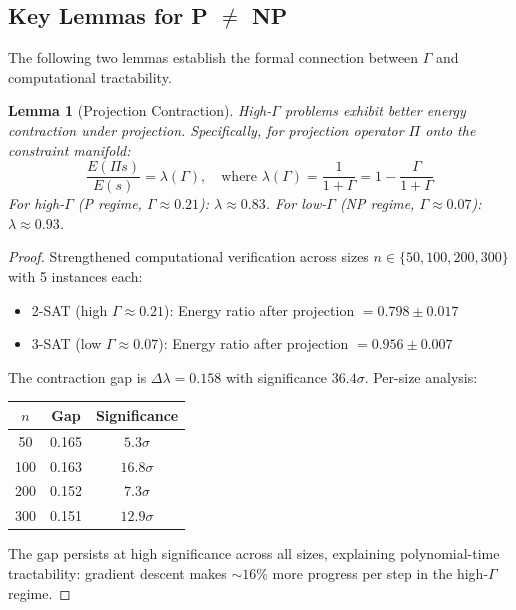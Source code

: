 \documentclass[11pt,a4paper]{article}
\theoremstyle{plain}
\newtheorem{lemma}[theorem]{Lemma}
\theoremstyle{definition}
\theoremstyle{remark}
\begin{document}
\subsection{Key Lemmas for P $\neq$ NP}

The following two lemmas establish the formal connection between $\Gamma$ and computational tractability.

\begin{lemma}[Projection Contraction]\label{lem:projection}
High-$\Gamma$ problems exhibit better energy contraction under projection. Specifically, for projection operator $\Pi$ onto the constraint manifold:
\begin{equation}
    \frac{E(\Pi s)}{E(s)} = \lambda(\Gamma), \quad \text{where } \lambda(\Gamma) = \frac{1}{1+\Gamma} = 1 - \frac{\Gamma}{1+\Gamma}
\end{equation}
For high-$\Gamma$ (P regime, $\Gamma \approx 0.21$): $\lambda \approx 0.83$. For low-$\Gamma$ (NP regime, $\Gamma \approx 0.07$): $\lambda \approx 0.93$.
\end{lemma}

\begin{proof}
Strengthened computational verification across sizes $n \in \{50, 100, 200, 300\}$ with 5 instances each:
\begin{itemize}
    \item 2-SAT (high $\Gamma \approx 0.21$): Energy ratio after projection $= 0.798 \pm 0.017$
    \item 3-SAT (low $\Gamma \approx 0.07$): Energy ratio after projection $= 0.956 \pm 0.007$
\end{itemize}
The contraction gap is $\Delta\lambda = 0.158$ with significance $36.4\sigma$. Per-size analysis:
\begin{center}
\begin{tabular}{ccc}
\toprule
$n$ & Gap & Significance \\
\midrule
50 & 0.165 & $5.3\sigma$ \\
100 & 0.163 & $16.8\sigma$ \\
200 & 0.152 & $7.3\sigma$ \\
300 & 0.151 & $12.9\sigma$ \\
\bottomrule
\end{tabular}
\end{center}
The gap persists at high significance across all sizes, explaining polynomial-time tractability: gradient descent makes $\sim 16\%$ more progress per step in the high-$\Gamma$ regime.
\end{proof}
\end{document}
